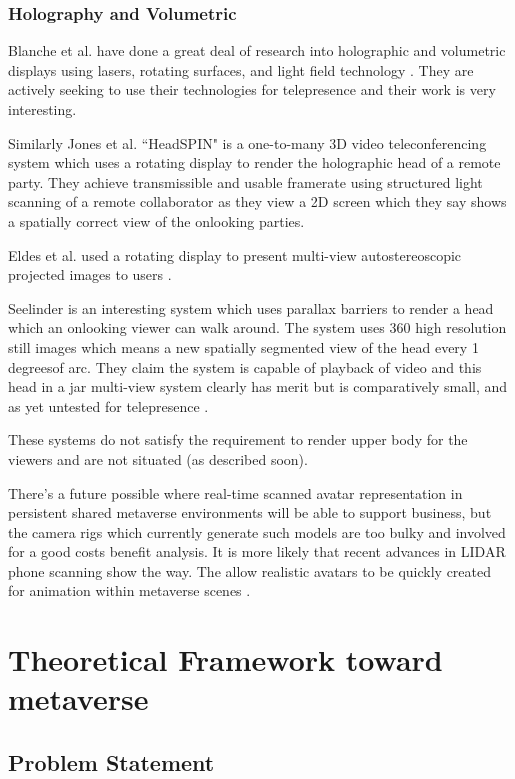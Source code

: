 \subsubsection{Holography and Volumetric}
Blanche et al. have done a great deal of research into holographic and volumetric displays using lasers, rotating surfaces, and light field technology   \cite{Blanche2010,Tay2008}. They are actively seeking to use their technologies for telepresence and their work is very interesting.\par
Similarly Jones et al. ``HeadSPIN" is a one-to-many 3D video teleconferencing system \cite{Jones2009} which uses a rotating display to render the holographic head of a remote party. They achieve transmissible and usable framerate using structured light scanning of a remote collaborator as they view a 2D screen which they say shows a spatially correct view of the onlooking parties.\par
Eldes et al. used a rotating display to present multi-view autostereoscopic projected images to users \cite{Eldes2013}.\par
Seelinder is an interesting system which uses parallax barriers to render a head which an onlooking viewer can walk around. The system uses 360 high resolution still images which means a new spatially segmented view of the head every 1 degreesof arc. They claim the system is capable of playback of video and this head in a jar multi-view system clearly has merit but is comparatively small, and as yet untested for telepresence \cite{Yendo2010}.\par
These systems do not satisfy the requirement to render upper body for the viewers and are not situated (as described soon).\par
There's a future possible where real-time scanned avatar representation in persistent shared metaverse environments will be able to support business, but the camera rigs which currently generate such models are too bulky and involved for a good costs benefit analysis. It is more likely that recent advances in LIDAR phone scanning show the way. The allow realistic avatars to be quickly created for animation within metaverse scenes \cite{authenticVolume2022}.

\section{Theoretical Framework toward metaverse}
        
\subsection{Problem Statement}

